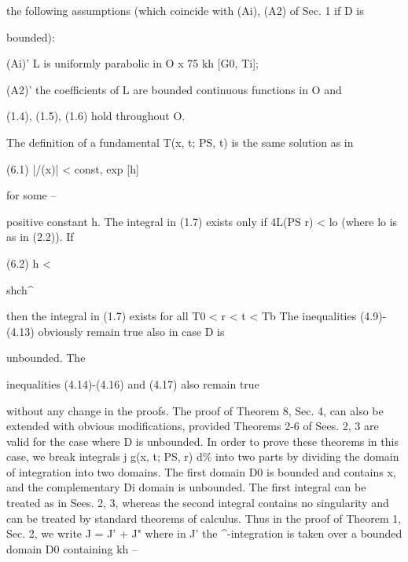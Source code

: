 \begin{ocrformula}
the following          assumptions         (which      coincide       with     (Ai), (A2) of Sec. 1 if D        is
\end{ocrformula}

bounded):

\begin{ocrformula}
(Ai)' L is uniformly   parabolic in O x 75 kh [G0, Ti];
\end{ocrformula}

(A2)' the coefficients of L are bounded continuous functions in O and

\begin{ocrformula}
(1.4), (1.5), (1.6) hold             throughout        O.
\end{ocrformula}

The definition of a fundamental T(x, t; PS, t) is the same solution as in

\begin{ocrformula}
(6.1)                                   |/(x)| < const, exp [h\x\2]
\end{ocrformula}

for some --

\begin{ocrformula}
positive constant h. The                      integral in (1.7) exists only if 4L(PS   r) <
lo (where lo is as in (2.2)). If
\end{ocrformula}

\begin{ocrformula}
(6.2)                                          h <
\end{ocrformula}

shch\textasciicircum{}

\begin{ocrformula}
then     the integral in (1.7) exists for all T0 < r < t < Tb
The inequalities (4.9)-(4.13) obviously     remain true also in case D                                   is
\end{ocrformula}

unbounded. The

\begin{ocrformula}
inequalities (4.14)-(4.16)   and   (4.17) also remain     true
\end{ocrformula}

without any change in the proofs. The proof of Theorem 8, Sec. 4, can also be extended with obvious modifications, provided Theorems 2-6 of Sees. 2, 3 are valid for the case where D is unbounded. In order to prove these theorems in this case, we break integrals j g(x, t; PS, r) d\% into two parts by dividing the domain of integration into two domains. The first domain D0 is bounded and contains x, and the complementary Di domain is unbounded. The first integral can be treated as in Sees. 2, 3, whereas the second integral contains no singularity and can be treated by standard theorems of calculus. Thus in the proof of Theorem 1, Sec. 2, we write J = J' + J" where in J' the \textasciicircum{}-integration is taken over a bounded domain D0 containing kh --


